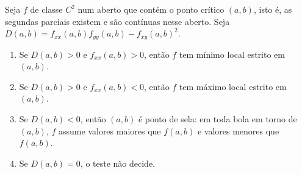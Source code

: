 \documentclass[11pt,a4paper]{article}
\begin{document}
\begin{teorema}
Seja $f$ de classe $C^2$ num aberto que contém o ponto crítico $(a,b)$, isto é, as segundas parciais existem e são contínuas nesse aberto. Seja $D(a,b)=f_{xx}(a,b)f_{yy}(a,b)-f_{xy}(a,b)^2$.
\begin{enumerate}[leftmargin=1.4em]
\item Se $D(a,b)>0$ e $f_{xx}(a,b)>0$, então $f$ tem mínimo local estrito em $(a,b)$.
\item Se $D(a,b)>0$ e $f_{xx}(a,b)<0$, então $f$ tem máximo local estrito em $(a,b)$.
\item Se $D(a,b)<0$, então $(a,b)$ é ponto de sela: em toda bola em torno de $(a,b)$, $f$ assume valores maiores que $f(a,b)$ e valores menores que $f(a,b)$.
\item Se $D(a,b)=0$, o teste não decide.
\end{enumerate}
\end{teorema}
\end{document}
